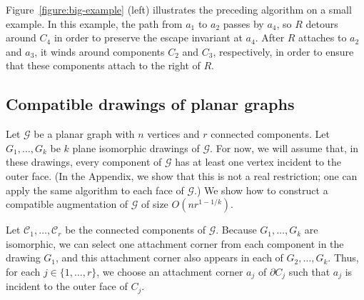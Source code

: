 \documentclass{patmorin}
\begin{document}
Figure~\ref{figure:big-example} (left) illustrates the preceding algorithm on a small example.  In this example, the path from $a_1$ to $a_2$ passes by $a_4$, so $R$ detours around $C_4$ in order to preserve the escape invariant at $a_4$.  After $R$ attaches to $a_2$ and $a_3$, it winds around components $C_2$ and $C_3$, respectively, in order to ensure that these components attach to the right of $R$.


\subsection{Compatible drawings of planar graphs}
Let $\mathcal G$ be a planar graph with $n$ vertices and $r$ connected
components.  Let $G_1, \ldots, G_k$ be $k$ plane isomorphic drawings
of $\mathcal G$.  For now, we will assume that, in these drawings,
every component of $\mathcal G$ has at least one vertex incident to
the outer face.  (In the Appendix, we show that this is not a real
restriction; one can apply the same algorithm to each face of $\mathcal
G$.)  We show how to construct a compatible augmentation of $\mathcal G$
of size $O(nr^{1-1/k})$.

Let $\mathcal C_1, \ldots, \mathcal C_r$ be the connected components of $\mathcal G$.  Because $G_1,\ldots,G_k$ are isomorphic, we can select one attachment corner from each component in the drawing $G_1$, and this attachment corner also appears in each of $G_2,\ldots,G_k$. Thus, for each $j\in\{1,\ldots,r\}$, we choose an attachment corner $a_j$ of $\partial C_j$ such that $a_j$ is incident to the outer face of $C_j$.
\end{document}
